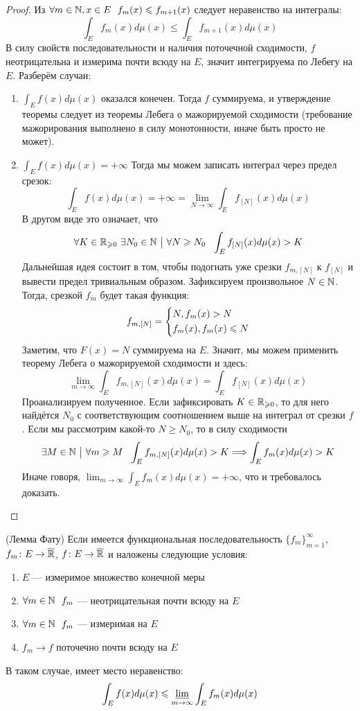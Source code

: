 \begin{proof}
	Из $\forall m \in \N, x \in E\ \ f_m(x) \le f_{m + 1}(x)$ следует неравенство на интегралы:
	\[
		\int_E f_m(x)d\mu(x) \le \int_E f_{m + 1}(x)d\mu(x)
	\]
	В силу свойств последовательности и наличия поточечной сходимости, $f$ неотрицательна и измерима почти всюду на $E$, значит интегрируема по Лебегу на $E$. Разберём случаи:
	\begin{enumerate}
		\item $\int_E f(x)d\mu(x)$ оказался конечен. Тогда $f$ суммируема, и утверждение теоремы следует из теоремы Лебега о мажорируемой сходимости (требование мажорирования выполнено в силу монотонности, иначе быть просто не может).
		
		\item $\int_E f(x)d\mu(x) = +\infty$ Тогда мы можем записать интеграл через предел срезок:
		\[
			\int_E f(x)d\mu(x) = +\infty = \lim_{N \to \infty} \int_E f_{[N]}(x)d\mu(x)
		\]
		В другом виде это означает, что
		\[
			\forall K \in \R_{\ge 0}\ \exists N_0 \in \N \such \forall N \ge N_0\ \ \int_E f_{[N]}(x)d\mu(x) > K
		\]
		Дальнейшая идея состоит в том, чтобы подогнать уже срезки $f_{m, [N]}$ к $f_{[N]}$ и вывести предел тривиальным образом. Зафиксируем произвольное $N \in \N$. Тогда, срезкой $f_m$ будет такая функция:
		\[
			f_{m, [N]} = \System{
				&{N, f_m(x) > N}
				\\
				&{f_m(x), f_m(x) \le N}
			}
		\]
		Заметим, что $F(x) = N$ суммируема на $E$. Значит, мы можем применить теорему Лебега о мажорируемой сходимости и здесь:
		\[
			\lim_{m \to \infty} \int_E f_{m, [N]}(x)d\mu(x) = \int_E f_{[N]}(x)d\mu(x)
		\]
		Проанализируем полученное. Если зафиксировать $K \in \R_{\ge 0}$, то для него найдётся $N_0$ с соответствующим соотношением выше на интеграл от срезки $f$. Если мы рассмотрим какой-то $N \ge N_0$, то в силу сходимости
		\[
			\exists M \in \N \such \forall m \ge M\ \ \int_E f_{m, [N]}(x)d\mu(x) > K \Lora \int_E f_m(x)d\mu(x) > K
		\]
		Иначе говоря, $\lim_{m \to \infty} \int_E f_m(x)d\mu(x) = +\infty$, что и требовалось доказать.
	\end{enumerate}
\end{proof}

\begin{theorem} (Лемма Фату)
	Если имеется функциональная последовательность $\{f_m\}_{m = 1}^\infty$, $f_m \colon E \to \ole{\R}$, $f \colon E \to \ole{\R}$ и наложены следующие условия:
	\begin{enumerate}
		\item $E$ --- измеримое множество конечной меры
		
		\item $\forall m \in \N\ \ f_m$ --- неотрицательная почти всюду на $E$
		
		\item $\forall m \in \N\ \ f_m$ --- измеримая на $E$
		
		\item $f_m \to f$ поточечно почти всюду на $E$ 
	\end{enumerate}
	В таком случае, имеет место неравенство:
	\[
		\int_E f(x)d\mu(x) \le \varliminf_{m \to \infty} \int_E f_m(x)d\mu(x)
	\]
\end{theorem}

